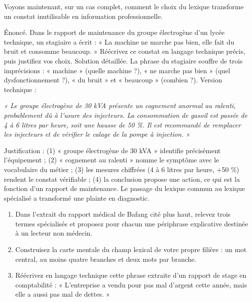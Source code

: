 \documentclass[11pt]{article}
\newcounter{popsec}
\newcounter{popsub}
\newcommand{\courssub}[1]{%
  \stepcounter{popsub}%
  \par\vspace{9pt}\noindent{\popxbold\fontsize{11.5}{13}\selectfont\color{popink}{\color{poporange}\thepopsec.\thepopsub}\hspace{6pt}#1}\par\nopagebreak\vspace{4pt}
}
\begin{document}
\courssub{Application guidée : du vague au précis}

Voyons maintenant, sur un cas complet, comment le choix du lexique transforme un constat inutilisable en information professionnelle.

\begin{exoresolu}
Énoncé. Dans le rapport de maintenance du groupe électrogène d'un lycée technique, un stagiaire a écrit : « La machine ne marche pas bien, elle fait du bruit et consomme beaucoup. » Réécrivez ce constat en langage technique précis, puis justifiez vos choix.
\tcblower
Solution détaillée. La phrase du stagiaire souffre de trois imprécisions : « machine » (quelle machine ?), « ne marche pas bien » (quel dysfonctionnement ?), « du bruit » et « beaucoup » (combien ?). Version technique :

\emph{« Le groupe électrogène de 30 kVA présente un cognement anormal au ralenti, probablement dû à l'usure des injecteurs. La consommation de gasoil est passée de 4 à 6 litres par heure, soit une hausse de 50 \%. Il est recommandé de remplacer les injecteurs et de vérifier le calage de la pompe à injection. »}

Justification : (1) « groupe électrogène de 30 kVA » identifie précisément l'équipement ; (2) « cognement au ralenti » nomme le symptôme avec le vocabulaire du métier ; (3) les mesures chiffrées (4 à 6 litres par heure, +50 \%) rendent le constat vérifiable ; (4) la conclusion propose une action, ce qui est la fonction d'un rapport de maintenance. Le passage du lexique commun au lexique spécialisé a transformé une plainte en diagnostic.
\end{exoresolu}

\begin{exercice}
\begin{enumerate}
\item Dans l'extrait du rapport médical de Bafang cité plus haut, relevez trois termes spécialisés et proposez pour chacun une périphrase explicative destinée à un lecteur non médecin.
\item Construisez la carte mentale du champ lexical de votre propre filière : un mot central, au moins quatre branches et deux mots par branche.
\item Réécrivez en langage technique cette phrase extraite d'un rapport de stage en comptabilité : « L'entreprise a vendu pour pas mal d'argent cette année, mais elle a aussi pas mal de dettes. »
\end{enumerate}
\end{exercice}
\end{document}
